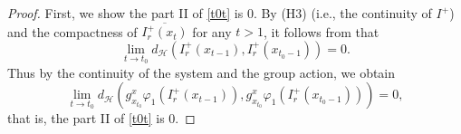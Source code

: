 \documentclass[a4paper,11pt]{article}
\theoremstyle{plain}
\theoremstyle{definition}
\numberwithin{equation}{section}
\begin{document}
\begin{proof}
    First, we show the part II of \eqref{t0t} is $0$. By (H3) (i.e., the continuity of $I^{+}$) and the compactness of $\overline{I^{+}_{r}(x_{t})}$ for any $t>1$, it follows from \cite[Corollary 5.21]{R-09} that
    \begin{equation}\label{tt0}
        \lim_{t\rightarrow t_{0}}d_{\mathcal{H}}(I^{+}_{r}(x_{t-1}),I^{+}_{r}(x_{t_{0}-1}))=0.
    \end{equation}
    Thus by the continuity of the system and the group action, we obtain 
    \begin{equation}\label{b}
        \lim_{t\rightarrow t_{0}}d_{\mathcal{H}}(g_{x_{t_{0}}}^{x}\varphi_1 (I^{+}_{r}(x_{t-1})),g_{x_{t_{0}}}^{x}\varphi_1 (I^{+}_{r}(x_{t_{0}-1})))=0,
    \end{equation}
    that is, the part II of \eqref{t0t} is $0$.
    

\end{proof}
\end{document}
